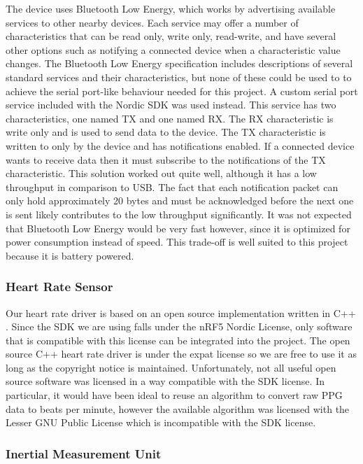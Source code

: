 The device uses Bluetooth Low Energy, which works by advertising
available services to other nearby devices. Each service may offer a number
of characteristics that can be read only, write only, read-write, and have 
several other options such as notifying a connected device when a characteristic
value changes. The Bluetooth Low Energy specification includes descriptions of several
standard services and their characteristics, but none of these could be used to
to achieve the serial port-like behaviour needed for this project. A custom
serial port service included with the Nordic SDK was used instead. This service
has two characteristics, one named TX and one named RX. The RX characteristic is
write only and is used to send data to the device. The TX characteristic is
written to only by the device and has notifications enabled. If a connected device
wants to receive data then it must subscribe to the notifications of the TX 
characteristic. This solution worked out quite well, although it has a low 
throughput in comparison to USB. The fact that each notification packet can only 
hold approximately 20 bytes and must be acknowledged before the next one is 
sent likely contributes to the low throughput significantly. It was not expected
that Bluetooth Low Energy would be very fast however, since it is optimized for 
power consumption instead of speed. This trade-off is well suited to this project 
because it is battery powered.

\subsubsection{Heart Rate Sensor}

Our heart rate driver is based on an open source implementation written in
C++ \cite{max86150-ardino}. Since the SDK we are using falls under the nRF5
Nordic License, only software that is compatible with this license can be
integrated into the project. The open source C++ heart rate driver is under the
expat license so we are free to use it as long as the copyright notice is
maintained. Unfortunately, not all useful open source software was licensed in
a way compatible with the SDK license. In particular, it would have been ideal
to reuse an algorithm to convert raw PPG data to beats per minute, however the
available algorithm was licensed with the Lesser GNU Public
License \cite{wasp-os} which is incompatible with the SDK license.

\subsubsection{Inertial Measurement Unit}


